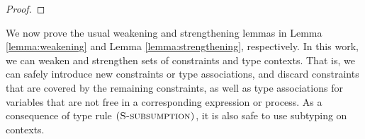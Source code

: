 \begin{lemma}
\begin{proof}
\end{proof}
\end{lemma}
%
We now prove the usual weakening and strengthening lemmas in Lemma \ref{lemma:weakening} and Lemma \ref{lemma:strengthening}, respectively. In this work, we can weaken and strengthen sets of constraints and type contexts. That is, we can safely introduce new constraints or type associations, and discard constraints that are covered by the remaining constraints, as well as type associations for variables that are not free in a corresponding expression or process. As a consequence of type rule $\mbox{\textsc{\protect{(S-subsumption})}}$, it is also safe to use subtyping on contexts.
